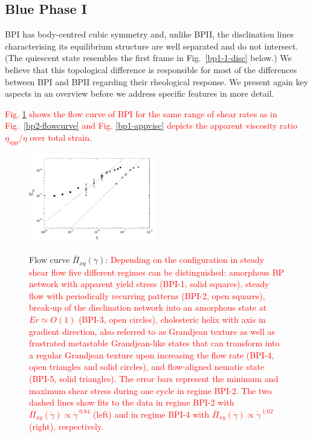 \documentclass[8.5pt,twoside,twocolumn]{article}
\newcommand{\gd}{\dot{\gamma}}
\newcommand{\rev}[1]{{\textcolor{red}{#1}}}
\begin{document}
\subsection{Blue Phase I}

BPI has body-centred cubic symmetry and, unlike BPII, the disclination lines
characterising its equilibrium structure are well separated and do not 
intersect. (The quiescent state resembles the first frame in Fig.~\ref{bp1-1-disc}
below.)
We believe that this topological difference is responsible for most of
the differences between BPI and BPII regarding their rheological response. 
We present again key aspects in an overview before we address specific features 
in more detail. 

\rev{
Fig. \ref{bp1-flowcurve} shows the flow curve of BPI for the same range of
shear rates as in Fig.~\ref{bp2-flowcurve} and Fig. \ref{bp1-appvisc} depicts 
the apparent viscosity ratio $\eta_{app}/\eta$ over total strain.
}

\begin{figure}[htpb]
\includegraphics[width=0.495\textwidth]{flowcurve_bp1.pdf}\\
\caption{Flow curve $\bar{\Pi}_{xy}(\gd)$: 
\rev{
Depending on the configuration in steady shear flow five different regimes 
can be distinguished: amorphous BP network with apparent yield stress (BPI-1, solid squares), 
steady flow with periodically recurring patterns (BPI-2, open squares), 
break-up of the disclination network into an amorphous state at $Er\simeq O(1)$ (BPI-3, open circles),
cholesteric helix with axis in gradient direction, also referred to
as Grandjean texture as well as frustrated metastable Grandjean-like states that can transform into 
a regular Grandjean texture upon increasing the flow rate (BPI-4, open triangles and solid circles),
and flow-aligned nematic state (BPI-5, solid triangles). 
The error bars represent the minimum and maximum shear stress 
during one cycle in regime BPI-2.
The two dashed lines show fits to the data in regime BPI-2 with 
$\bar{\Pi}_{xy}(\gd)\propto \gd^{\;0.84}$ (left) 
and in regime BPI-4 with 
$\bar{\Pi}_{xy}(\gd)\propto \gd^{\;1.02}$ (right), respectively.}
}
\label{bp1-flowcurve}
\end{figure}
\end{document}
